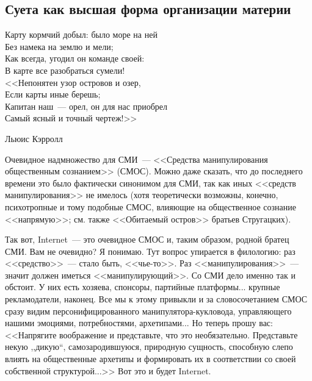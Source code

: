 \documentclass{scrbook}
\makeatletter
\newcommand{\defaultepigraphwidth}{0.5} %
\newcommand{\glqq}{,,}
\newcommand{\grqq}{``}
\newcommand{\flqq}{<<}
\newcommand{\frqq}{>>}
\newcommand{\mdash}{~--- }
\newcommand{\essaysection}[1]{\subsection*{#1}\nopagebreak}
\newcommand{\myepigraph}[3][\@empty]{
	\ifx\@empty#1
		\setlength{\epigraphwidth}{\defaultepigraphwidth\textwidth}
	\else
		\setlength{\epigraphwidth}{#1\textwidth}
	\fi
	\epigraph{#2}{#3}
	\setlength{\epigraphwidth}{\defaultepigraphwidth\textwidth} %
	\nopagebreak
}
\makeatother
\begin{document}
\essaysection{Суета как высшая форма организации материи}

\myepigraph{Карту кормчий добыл: было море на ней \\
Без намека на землю и мели; \\
Как всегда, угодил он команде своей: \\
В карте все разобраться сумели! \\
{\flqq}Непонятен узор островов и озер, \\
Если карты иные берешь; \\
Капитан наш{\mdash}орел, он для нас приобрел \\
Самый ясный и точный чертеж!{\frqq}}
{Льюис Кэрролл}

Очевидное надмножество для СМИ{\mdash}{\flqq}Средства манипулирования общественным сознанием{\frqq} (СМОС). Можно даже сказать, что до последнего времени это было фактически синонимом для СМИ, так как иных {\flqq}средств манипулирования{\frqq} не имелось (хотя теоретически возможны, конечно, психотропные и тому подобные СМОС, влияющие на общественное сознание {\flqq}напрямую{\frqq}; см. также {\flqq}Обитаемый остров{\frqq} братьев Стругацких).

Так вот, Internet{\mdash}это очевидное СМОС и, таким образом, родной братец СМИ. Вам не очевидно? Я понимаю. Тут вопрос упирается в филологию: раз {\flqq}средство{\frqq}{\mdash}стало быть, {\flqq}чье-то{\frqq}. Раз {\flqq}манипулирования{\frqq}{\mdash}значит должен иметься {\flqq}манипулирующий{\frqq}. Со СМИ дело именно так и обстоит. У них есть хозяева, спонсоры, партийные платформы... крупные рекламодатели, наконец. Все мы к этому привыкли и за словосочетанием СМОС сразу видим персонифицированного манипулятора-кукловода, управляющего нашими эмоциями, потребностями, архетипами... Но теперь прошу вас: {\flqq}Напрягите воображение и представьте, что это необязательно. Представьте некую {\glqq}дикую{\grqq}, самозародившуюся, природную сущность, способную слепо влиять на общественные архетипы и формировать их в соответствии со своей собственной структурой...{\frqq} Вот это и будет Internet.
\end{document}
